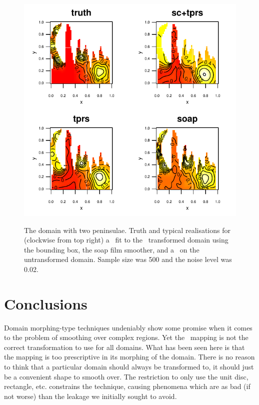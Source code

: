 \begin{figure}
\centering
\includegraphics[width=6in]{sc/figs/wigglytop2-bbox-real.pdf} \\
\caption{The domain with two peninsulae. Truth and typical realisations for (clockwise from top right) a \tprs\ fit to the \sch\ transformed domain using the bounding box, the soap film smoother, and a \tprs\ on the untransformed domain. Sample size was 500 and the noise level was 0.02.}
\label{wigglytop2-bbox-real}
\end{figure}


\section{Conclusions}
\label{sc-conclusions}

Domain morphing-type techniques undeniably show some promise when it comes to the problem of smoothing over complex regions. Yet the \sch\ mapping is not the correct transformation to use for  all domains. What has been seen here is that the mapping is too prescriptive in its morphing of the domain. There is no reason to think that a particular domain should always be transformed to, it should just be a convenient shape to smooth over. The restriction to only use the unit disc, rectangle, etc. constrains the technique, causing phenomena which are as bad (if not worse) than the leakage we initially sought to avoid.

